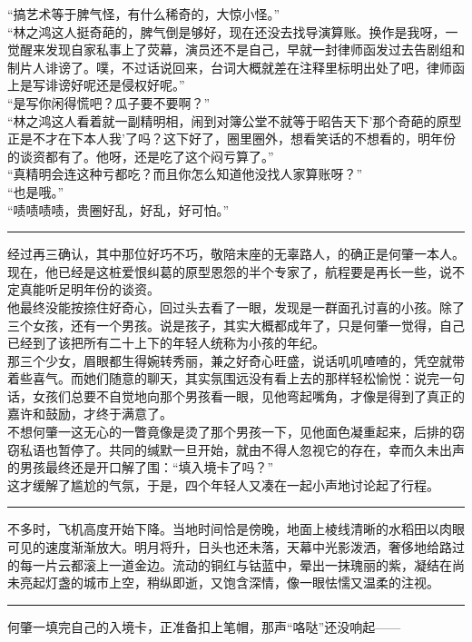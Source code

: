 \documentclass[oneside,11pt]{memoir} %
\begin{document}
\begin{CJK}{UTF8}{gbsn}
    “搞艺术等于脾气怪，有什么稀奇的，大惊小怪。”\\\indent
    “林之鸿这人挺奇葩的，脾气倒是够好，现在还没去找导演算账。换作是我呀，一觉醒来发现自家私事上了荧幕，演员还不是自己，早就一封律师函发过去告剧组和制片人诽谤了。噗，不过话说回来，台词大概就差在注释里标明出处了吧，律师函上是写诽谤好呢还是侵权好呢。”\\\indent
    “是写你闲得慌吧？瓜子要不要啊？”\\\indent
    “林之鸿这人看着就一副精明相，闹到对簿公堂不就等于昭告天下'那个奇葩的原型正是不才在下本人我’了吗？这下好了，圈里圈外，想看笑话的不想看的，明年份的谈资都有了。他呀，还是吃了这个闷亏算了。”\\\indent
    “真精明会连这种亏都吃？而且你怎么知道他没找人家算账呀？”\\\indent
    “也是哦。”\\\indent
    “啧啧啧啧，贵圈好乱，好乱，好可怕。”\\\indent
\rule{-3pt}{30pt}
    经过再三确认，其中那位好巧不巧，敬陪末座的无辜路人，的确正是何肇一本人。\\\indent
    现在，他已经是这桩爱恨纠葛的原型恩怨的半个专家了，航程要是再长一些，说不定真能听足明年份的谈资。\\\indent
   他最终没能按捺住好奇心，回过头去看了一眼，发现是一群面孔讨喜的小孩。除了三个女孩，还有一个男孩。说是孩子，其实大概都成年了，只是何肇一觉得，自己已经到了该把所有二十上下的年轻人统称为小孩的年纪。\\\indent
   那三个少女，眉眼都生得婉转秀丽，兼之好奇心旺盛，说话叽叽喳喳的，凭空就带着些喜气。而她们随意的聊天，其实氛围远没有看上去的那样轻松愉悦：说完一句话，女孩们总要不自觉地向那个男孩看一眼，见他弯起嘴角，才像是得到了真正的嘉许和鼓励，才终于满意了。\\\indent
    不想何肇一这无心的一瞥竟像是烫了那个男孩一下，见他面色凝重起来，后排的窃窃私语也暂停了。共同的缄默一旦开始，就由不得人忽视它的存在，幸而久未出声的男孩最终还是开口解了围：“填入境卡了吗？”\\\indent
   这才缓解了尴尬的气氛，于是，四个年轻人又凑在一起小声地讨论起了行程。\\\indent
\rule{-3pt}{30pt}
    不多时，飞机高度开始下降。当地时间恰是傍晚，地面上棱线清晰的水稻田以肉眼可见的速度渐渐放大。明月将升，日头也还未落，天幕中光影泼洒，奢侈地给路过的每一片云都滚上一道金边。流动的铜红与钴蓝中，晕出一抹瑰丽的紫，凝结在尚未亮起灯盏的城市上空，稍纵即逝，又饱含深情，像一眼怯懦又温柔的注视。\\\indent
\rule{-3pt}{30pt}
    何肇一填完自己的入境卡，正准备扣上笔帽，那声“咯哒”还没响起——\\\indent

\end{CJK}
\end{document}
